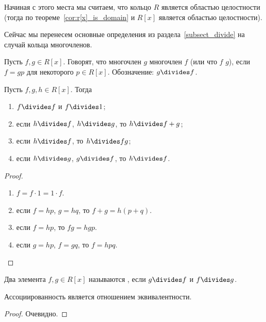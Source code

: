 
Начиная с этого места мы считаем, что кольцо $R$ является областью
целостности (тогда по теореме~\ref{cor:r[x]_is_domain} и $R[x]$
является областью целостности).

Сейчас мы перенесем основные определения из
раздела~\ref{subsect_divide} на случай кольца многочленов.

\begin{definition}
Пусть $f,g\in R[x]$. Говорят, что многочлен $g$
многочлен $f$ (или что $f$  $g$), если $f=gp$ для
некоторого $p\in R[x]$. Обозначение:
$g\divides f$.
\end{definition}
\begin{proposition}
Пусть $f,g,h\in R[x]$. Тогда
\begin{enumerate}
\item $f\divides f$ и $f\divides 1$;
\item если $h\divides f$, $h\divides g$, то $h\divides f+g$;
\item если $h\divides f$, то $h\divides fg$;
\item если $h\divides g$, $g\divides f$, то $h\divides f$.
\end{enumerate}
\end{proposition}
\begin{proof}
\begin{enumerate}
\item $f=f\cdot 1=1\cdot f$.
\item если $f=hp$, $g=hq$, то $f+g=h(p+q)$.
\item если $f=hp$, то $fg=hgp$.
\item если $g=hp$, $f=gq$, то $f=hpq$.
\end{enumerate}
\end{proof}

\begin{definition}
Два элемента $f,g\in R[x]$ называются
, если
$g\divides f$ и $f\divides g$.
\end{definition}
\begin{proposition}
Ассоциированность является отношением эквивалентности.
\end{proposition}
\begin{proof}
Очевидно.
\end{proof}


